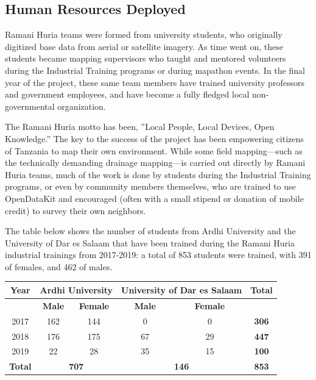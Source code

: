 \documentclass[a4paper,12pt,twoside]{article}
\begin{document}
\subsection{Human Resources Deployed}

Ramani Huria teams were formed from university students, who originally digitized base data from aerial or satellite imagery.  As time went on, these students became mapping  supervisors who taught and mentored volunteers during the Industrial Training programs or during mapathon events. In the final year of the project, these same team members have trained university professors and government employees, and have become a fully fledged local non-governmental organization. 

The Ramani Huria motto has been, ”Local People, Local Devices, Open Knowledge.” The key to the success of the project has been empowering citizens of Tanzania to map their own environment. While some field mapping—such as the technically demanding drainage mapping—is carried out directly by Ramani Huria teams, much of the work is done by students during the Industrial Training programs, or even by community members themselves, who are trained to use OpenDataKit and encouraged (often with a small stipend or donation of mobile credit) to survey their own neighbors.

The table below shows the number of students from Ardhi University and the University of Dar es Salaam that have been trained during the Ramani Huria industrial trainings from 2017-2019: a total of 853 students were trained, with 391 of females, and 462 of males.

\begin{center}
\begin{tabular}{|c|c|c|c|c|c|}
\hline 
{\bfseries Year} & \multicolumn{2}{|c|}{\bfseries Ardhi University} & \multicolumn{2}{|c|}{\bfseries University of Dar es Salaam} & {\bfseries Total}\\
  \hline
  {} & \bfseries Male & \bfseries Female & \bfseries Male & \bfseries Female & {}\\
  \hline
  2017 & 162 & 144 & 0 & 0 & \bfseries 306\\
  \hline
  2018 & 176 & 175 & 67 & 29 & \bfseries 447\\
  \hline
  2019 & 22 & 28 & 35 & 15 & \bfseries 100 \\
  \hline 
  \bfseries Total & \multicolumn{2}{|c|}{\bfseries 707} & \multicolumn{2}{|c|}{\bfseries 146} & \bfseries 853\\
  \hline
 \end{tabular}
\end{center}
\end{document}
